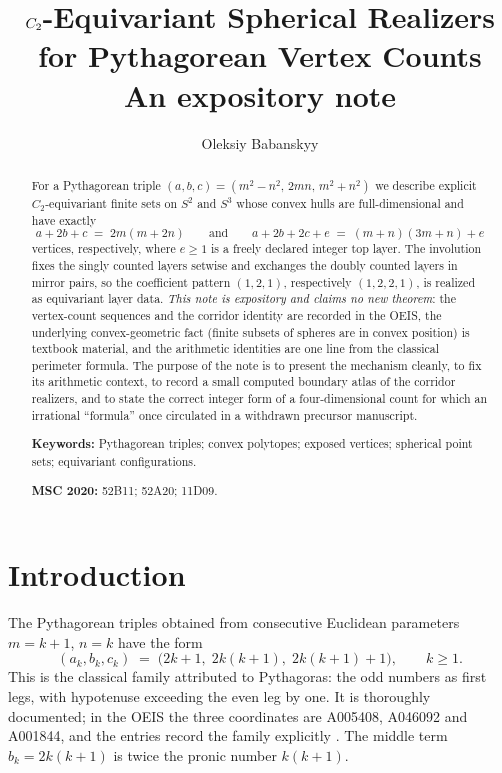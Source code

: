 \documentclass[11pt]{article}
\title{$\Ctwo$-Equivariant Spherical Realizers\\ for Pythagorean Vertex Counts\\[0.5em]
\large An expository note}
\author{Oleksiy Babanskyy}
\date{}
\theoremstyle{definition}
\theoremstyle{remark}
\newcommand{\Ctwo}{C_2}
\begin{document}
\maketitle

\begin{abstract}
\noindent
For a Pythagorean triple $(a,b,c)=(m^2-n^2,\,2mn,\,m^2+n^2)$ we describe
explicit $\Ctwo$-equivariant finite sets on $S^2$ and $S^3$ whose convex
hulls are full-dimensional and have exactly
\[
a+2b+c \;=\; 2m(m+2n)
\qquad\text{and}\qquad
a+2b+2c+e \;=\; (m+n)(3m+n)+e
\]
vertices, respectively, where $e\ge 1$ is a freely declared integer top
layer. The involution fixes the singly counted layers setwise and exchanges
the doubly counted layers in mirror pairs, so the coefficient pattern
$(1,2,1)$, respectively $(1,2,2,1)$, is realized as equivariant layer data.
\emph{This note is expository and claims no new theorem}: the vertex-count
sequences and the corridor identity are recorded in the OEIS, the underlying
convex-geometric fact (finite subsets of spheres are in convex position) is
textbook material, and the arithmetic identities are one line from the
classical perimeter formula. The purpose of the note is to present the
mechanism cleanly, to fix its arithmetic context, to record a small
computed boundary atlas of the corridor realizers, and to state the
correct integer form of a four-dimensional count for which an irrational
``formula'' once circulated in a withdrawn precursor manuscript.
\medskip

\noindent\textbf{Keywords:} Pythagorean triples; convex polytopes; exposed
vertices; spherical point sets; equivariant configurations.

\smallskip
\noindent\textbf{MSC 2020:} 52B11; 52A20; 11D09.
\end{abstract}

\section{Introduction}\label{sec:intro}

The Pythagorean triples obtained from consecutive Euclidean parameters
$m=k+1$, $n=k$ have the form
\[
(a_k,b_k,c_k) \;=\; \bigl(2k+1,\; 2k(k+1),\; 2k(k+1)+1\bigr),
\qquad k\ge 1 .
\]
This is the classical family attributed to Pythagoras: the odd numbers as
first legs, with hypotenuse exceeding the even leg by one. It is thoroughly
documented; in the OEIS the three coordinates are A005408, A046092 and
A001844, and the entries record the family explicitly
\cite{oeis,sierpinski}. The middle term $b_k=2k(k+1)$ is twice the pronic
number $k(k+1)$.
\end{document}
